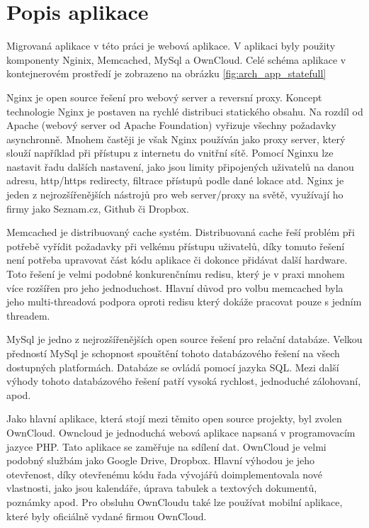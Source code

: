 \section{Popis aplikace}
Migrovaná aplikace v této práci je webová aplikace. V aplikaci byly použity komponenty Nginix, Memcached, MySql a OwnCloud. Celé schéma aplikace v kontejnerovém prostředí je zobrazeno na obrázku \ref{fig:arch_app_statefull}

Nginx je open source řešení pro webový server a reversní proxy. Koncept technologie Nginx je postaven na rychlé distribuci statického obsahu. Na rozdíl od Apache (webový server od Apache Foundation) vyřizuje všechny požadavky asynchronně. Mnohem častěji je však Nginx používán jako proxy server, který slouží například při přístupu z internetu do vnitřní sítě. Pomocí Nginxu lze nastavit řadu dalších nastavení, jako jsou limity připojených uživatelů na danou adresu, http/https redirecty, filtrace přístupů podle dané lokace atd. Nginx je jeden z nejrozšířenějších nástrojů pro web server/proxy na světě, využívají ho firmy jako Seznam.cz, Github či Dropbox\cite{ngnix}. 

Memcached je distribuovaný cache systém. Distribuovaná cache řeší problém při potřebě vyřídit požadavky při velkému přístupu uživatelů, díky tomuto řešení není potřeba upravovat část kódu aplikace či dokonce přidávat další hardware. Toto řešení je velmi podobné konkurenčnímu redisu, který je v praxi mnohem více rozšířen pro jeho jednoduchost. Hlavní důvod pro volbu memcached byla jeho multi-threadová podpora oproti redisu který dokáže pracovat pouze s jedním threadem. 

MySql je jedno z nejrozšířenějších open source řešení pro relační databáze. Velkou předností MySql je schopnost spouštění tohoto databázového řešení na všech dostupných platformách. Databáze se ovládá pomocí jazyka SQL. Mezi další výhody tohoto databázového řešení patří vysoká rychlost, jednoduché zálohovaní, apod. 

Jako hlavní aplikace, která stojí mezi těmito open source projekty, byl zvolen OwnCloud. Owncloud je jednoduchá webová aplikace napsaná v programovacím jazyce PHP. Tato aplikace se zaměřuje na sdílení dat. OwnCloud je velmi podobný službám jako Google Drive, Dropbox. Hlavní výhodou je jeho otevřenost, díky otevřenému kódu řada vývojářů doimplementovala nové vlastnosti, jako jsou kalendáře, úprava tabulek a textových dokumentů, poznámky apod. Pro obsluhu OwnCloudu také lze používat mobilní aplikace, které byly oficiálně vydané firmou OwnCloud. 

